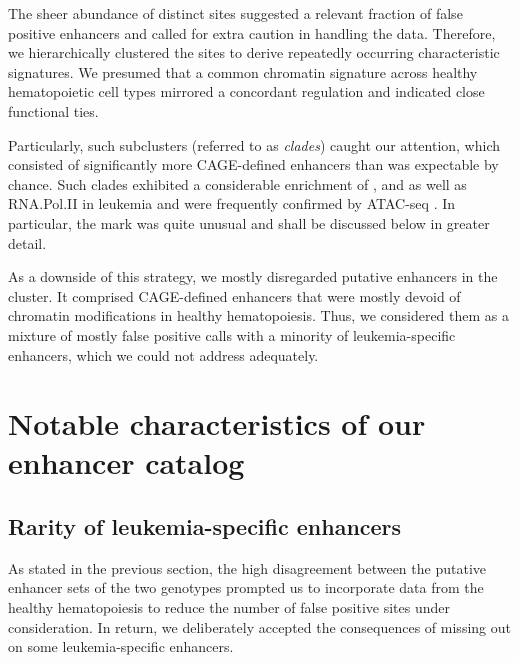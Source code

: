 The sheer abundance of distinct sites suggested a relevant fraction of false positive enhancers and called for extra caution in handling the data. Therefore, we hierarchically clustered the sites to derive repeatedly occurring characteristic signatures. We presumed that a common chromatin signature across healthy hematopoietic cell types mirrored a concordant regulation and indicated close functional ties.  

Particularly, such subclusters (referred to as \emph{clades}) caught our attention, which consisted of significantly more CAGE-defined enhancers than was expectable by chance. Such clades exhibited a considerable enrichment of \hisfourthree, \hiseighteenac and \histwentysevenac as well as RNA.Pol.II in \mllafnine leukemia	 and were frequently confirmed by ATAC-seq 	. In particular, the \hisfourthree mark was quite unusual and shall be discussed below in greater detail. 

As a downside of this strategy, we mostly disregarded putative enhancers in the \amitten cluster. It comprised CAGE-defined enhancers that were mostly devoid of chromatin modifications in healthy hematopoiesis. Thus, we considered them as a mixture of mostly false positive calls with a minority of leukemia-specific enhancers, which we could not address adequately.  

\section{Notable characteristics of our enhancer catalog}
\label{chap:d:enhancers:mechanism:properties}

\subsection{Rarity of leukemia-specific enhancers}
\label{chap:d:enhancers:mechanism:properties:rarity}

As stated in the previous section, the high disagreement between the putative enhancer sets of the two genotypes prompted us to incorporate data from the healthy hematopoiesis to reduce the number of false positive sites under consideration. In return, we deliberately accepted the consequences of missing out on some leukemia-specific enhancers.

